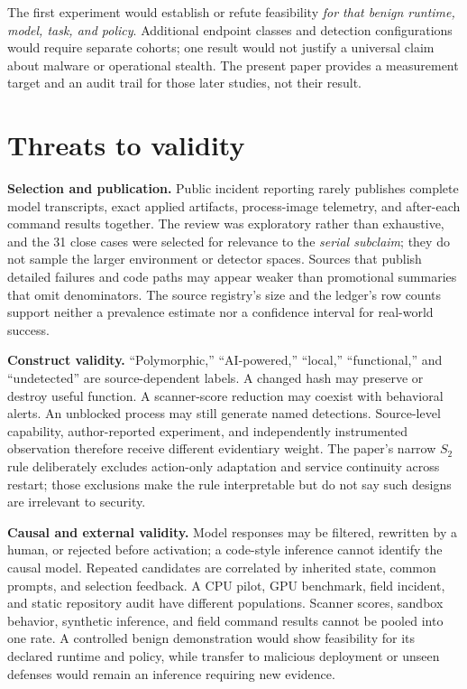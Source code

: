 \documentclass[11pt,letterpaper]{article}
\begin{document}
The first experiment would establish or refute feasibility \emph{for that benign runtime, model, task, and policy}. Additional endpoint classes and detection configurations would require separate cohorts; one result would not justify a universal claim about malware or operational stealth. The present paper provides a measurement target and an audit trail for those later studies, not their result.

\section{Threats to validity}\label{sec:limits}

\textbf{Selection and publication.} Public incident reporting rarely publishes complete model transcripts, exact applied artifacts, process-image telemetry, and after-each command results together. The review was exploratory rather than exhaustive, and the 31 close cases were selected for relevance to the \emph{serial subclaim}; they do not sample the larger environment or detector spaces. Sources that publish detailed failures and code paths may appear weaker than promotional summaries that omit denominators. The source registry's size and the ledger's row counts support neither a prevalence estimate nor a confidence interval for real-world success.

\textbf{Construct validity.} ``Polymorphic,'' ``AI-powered,'' ``local,'' ``functional,'' and ``undetected'' are source-dependent labels. A changed hash may preserve or destroy useful function. A scanner-score reduction may coexist with behavioral alerts. An unblocked process may still generate named detections. Source-level capability, author-reported experiment, and independently instrumented observation therefore receive different evidentiary weight. The paper's narrow $S_2$ rule deliberately excludes action-only adaptation and service continuity across restart; those exclusions make the rule interpretable but do not say such designs are irrelevant to security.

\textbf{Causal and external validity.} Model responses may be filtered, rewritten by a human, or rejected before activation; a code-style inference cannot identify the causal model. Repeated candidates are correlated by inherited state, common prompts, and selection feedback. A CPU pilot, GPU benchmark, field incident, and static repository audit have different populations. Scanner scores, sandbox behavior, synthetic inference, and field command results cannot be pooled into one rate. A controlled benign demonstration would show feasibility for its declared runtime and policy, while transfer to malicious deployment or unseen defenses would remain an inference requiring new evidence.
\end{document}
